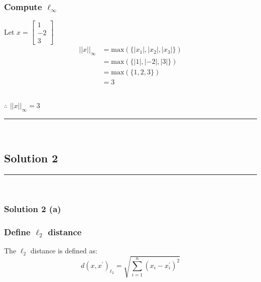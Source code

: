 \documentclass{article}
\begin{document}
\subsubsection*{Compute $\ell_{\infty}$}
\parbox{\textwidth}{
Let $x=\begin{bmatrix} 1 \\ -2 \\ 3 \end{bmatrix}$ \\

\begin{align*}
  ||x||_{\infty} &= \text{max}(\{|x_{1}|,|x_{2}|,|x_{3}|\}) \\
  &= \text{max}(\{|1|,|-2|,|3|\}) \\
  &= \text{max}(\{1,2,3\}) \\
  &= 3 \\
\end{align*}
}

\subsubsection*{\normalfont}{$\therefore$ $||x||_{\infty} = 3$}

\noindent\rule{\textwidth}{0.4pt}\\

\newpage


\subsection*{Solution 2}
\noindent\rule{\textwidth}{0.4pt}\\
\subsubsection*{Solution 2 (a)}

\subsubsection*{Define $\ell_{2}$ distance}
\parbox{\textwidth}{The $\ell_2$ distance is defined as:
$$d(x, x^{\prime})_{\ell_2} = \sqrt{\sum_{i=1}^{n} (x_i-x_{i}^{\prime})^2}$$
}
\end{document}
